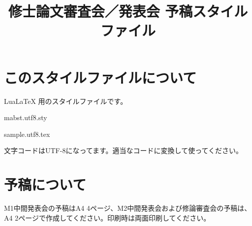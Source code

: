 \documentclass[]{ltjsarticle}
\title{
修士論文審査会／発表会 予稿スタイルファイル
}
\begin{document}
\maketitle

\section{このスタイルファイルについて}
LuaLaTeX 用のスタイルファイルです。

mabst.utf8.sty

sample.utf8.tex

文字コードはUTF-8になってます。適当なコードに変換して使ってください。

\section{予稿について}

M1中間発表会の予稿はA4 4ページ、M2中間発表会および修論審査会の予稿は、A4
2ページで作成してください。印刷時は両面印刷してください。
\end{document}
